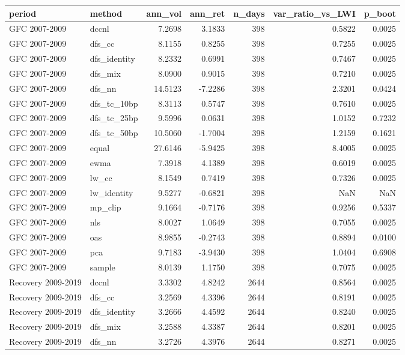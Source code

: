 \begin{tabular}{llrrrrr}
\toprule
period & method & ann_vol & ann_ret & n_days & var_ratio_vs_LWI & p_boot \\
\midrule
GFC 2007-2009 & dccnl & 7.2698 & 3.1833 & 398 & 0.5822 & 0.0025 \\
GFC 2007-2009 & dfs_cc & 8.1155 & 0.8255 & 398 & 0.7255 & 0.0025 \\
GFC 2007-2009 & dfs_identity & 8.2332 & 0.6991 & 398 & 0.7467 & 0.0025 \\
GFC 2007-2009 & dfs_mix & 8.0900 & 0.9015 & 398 & 0.7210 & 0.0025 \\
GFC 2007-2009 & dfs_nn & 14.5123 & -7.2286 & 398 & 2.3201 & 0.0424 \\
GFC 2007-2009 & dfs_tc_10bp & 8.3113 & 0.5747 & 398 & 0.7610 & 0.0025 \\
GFC 2007-2009 & dfs_tc_25bp & 9.5996 & 0.0631 & 398 & 1.0152 & 0.7232 \\
GFC 2007-2009 & dfs_tc_50bp & 10.5060 & -1.7004 & 398 & 1.2159 & 0.1621 \\
GFC 2007-2009 & equal & 27.6146 & -5.9425 & 398 & 8.4005 & 0.0025 \\
GFC 2007-2009 & ewma & 7.3918 & 4.1389 & 398 & 0.6019 & 0.0025 \\
GFC 2007-2009 & lw_cc & 8.1549 & 0.7419 & 398 & 0.7326 & 0.0025 \\
GFC 2007-2009 & lw_identity & 9.5277 & -0.6821 & 398 & NaN & NaN \\
GFC 2007-2009 & mp_clip & 9.1664 & -0.7176 & 398 & 0.9256 & 0.5337 \\
GFC 2007-2009 & nls & 8.0027 & 1.0649 & 398 & 0.7055 & 0.0025 \\
GFC 2007-2009 & oas & 8.9855 & -0.2743 & 398 & 0.8894 & 0.0100 \\
GFC 2007-2009 & pca & 9.7183 & -3.9430 & 398 & 1.0404 & 0.6908 \\
GFC 2007-2009 & sample & 8.0139 & 1.1750 & 398 & 0.7075 & 0.0025 \\
Recovery 2009-2019 & dccnl & 3.3302 & 4.8242 & 2644 & 0.8564 & 0.0025 \\
Recovery 2009-2019 & dfs_cc & 3.2569 & 4.3396 & 2644 & 0.8191 & 0.0025 \\
Recovery 2009-2019 & dfs_identity & 3.2666 & 4.4592 & 2644 & 0.8240 & 0.0025 \\
Recovery 2009-2019 & dfs_mix & 3.2588 & 4.3387 & 2644 & 0.8201 & 0.0025 \\
Recovery 2009-2019 & dfs_nn & 3.2726 & 4.3976 & 2644 & 0.8271 & 0.0025 \\

\end{tabular}
